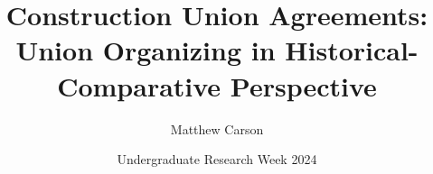 \documentclass{beamer}
\title[Construction Union\ldots{Historical-Comparative}]{Construction Union Agreements: Union Organizing in Historical-Comparative Perspective}
\author{Matthew Carson}
\date[Undergrad. Research Week '24]{Undergraduate Research Week 2024}
\begin{document}
\begin{frame}
  \titlepage
\end{frame}





\end{document}
